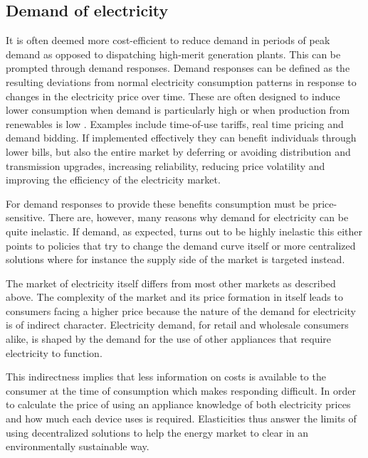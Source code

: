 \subsection{Demand of electricity}
\label{subsec:t_demand}
It is often deemed more cost-efficient to reduce demand in periods of peak demand as opposed to dispatching high-merit generation plants. This can be prompted through demand responses. Demand responses can be defined as the resulting deviations from normal electricity consumption patterns in response to changes in the electricity price over time. These are often designed to induce lower consumption when demand is particularly high or when production from renewables is low \citep{albadi2008summary}. Examples include time-of-use tariffs, real time pricing and demand bidding. If implemented effectively they can benefit individuals through lower bills, but also the entire market by deferring or avoiding distribution and transmission upgrades, increasing reliability, reducing price volatility and improving the efficiency of the electricity market.
\par
For demand responses to provide these benefits consumption must be price-sensitive. There are, however, many reasons why demand for electricity can be quite inelastic. If demand, as expected, turns out to be highly inelastic this either points to policies that try to change the demand curve itself or more centralized solutions where for instance the supply side of the market is targeted instead.
\bigskip \par
The market of electricity itself differs from most other markets as described above. The complexity of the market and its price formation in itself leads to consumers facing a higher price because the nature of the demand for electricity is of indirect character. Electricity demand, for retail and wholesale consumers alike, is shaped by the demand for the use of other appliances that require electricity to function.
\par
This indirectness implies that less information on costs is available to the consumer at the time of consumption which makes responding difficult. In order to calculate the price of using an appliance knowledge of both electricity prices and how much each device uses is required. Elasticities thus answer the limits of using decentralized solutions to help the energy market to clear in an environmentally sustainable way.
\bigskip \par
